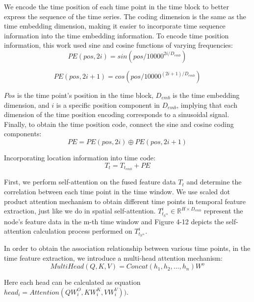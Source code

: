 \documentclass[conference]{IEEEtran}
\begin{document}
\par
We encode the time position of each time point in the time block to better express the sequence of the time series. The coding dimension is the same as the time embedding dimension, making it easier to incorporate time sequence information into the time embedding information. To encode time position information, this work used sine and cosine functions of varying frequencies:
\begin{equation}
    PE(pos, 2i) = sin(pos/10000^{2i/D_{emb}})
\end{equation}

\begin{equation}
    PE(pos, 2i + 1) = cos(pos/10000^{(2i + 1)/D_{emb}})
\end{equation}
\par
$Pos$ is the time point's position in the time block, $D_ {emb}$ is the time embedding dimension, and $i$ is a specific position component in $D_{emb}$,  implying that each dimension of the time position encoding corresponds to a sinusoidal signal. Finally, to obtain the time position code, connect the sine and cosine coding components:
\begin{equation}
    PE = PE(pos,2i)\oplus PE(pos,2i + 1)
\end{equation}
\par
Incorporating location information into time code:
\begin{equation}
   T_t = T_{t_{emb}} + PE
\end{equation}
\par
First, we perform self-attention on the fused feature data $T_t$ and determine the correlation between each time point in the time window. We use scaled dot product attention mechanism to obtain different time points in temporal feature extraction, just like we do in spatial self-attention. $T^i_{t_{h^m}} \in \mathbb{R}^{H \times D_{emb}} $ represent the node's feature data in the m-th time window and Figure 4-12 depicts the self-attention calculation process performed on $T^i_{t_{h^m}}$.
\par
In order to obtain the association relationship between various time points, in the time feature extraction, we introduce a multi-head attention mechanism:
\begin{equation}
      MultiHead(Q,K,V) = Concat(h_1,h_2,... ,h_{n})W^o
\end{equation}
\par
Here each head can be calculated as equation $head_i = Attention(QW_i^O,KW_i^K,VW_i^V))$.
\end{document}
